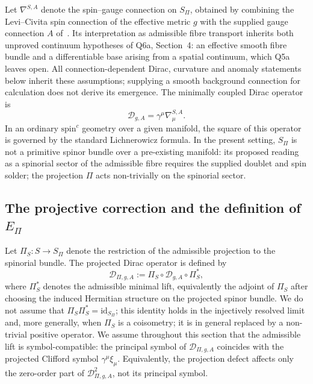\documentclass[11pt,a4paper]{article}
\theoremstyle{definition}
\theoremstyle{remark}
\begin{document}
    Let $\nabla^{S,A}$ denote the spin--gauge connection on $S_\Pi$, obtained by
    combining the Levi--Civita spin connection of the effective metric $g$ with the
    supplied gauge connection $A$ of~\cite{Beau2026q6a,Beau2026q12}.
    Its interpretation as admissible fibre transport inherits both unproved continuum hypotheses of
    Q6a, Section~4: an effective smooth fibre bundle and a differentiable base arising from a spatial
    continuum, which Q5a leaves open.
    All connection-dependent Dirac, curvature and anomaly statements below inherit these assumptions;
    supplying a smooth background connection for calculation does not derive its emergence.
    The minimally coupled Dirac operator is
    \begin{equation}
      \label{eq:minimal-dirac}
      \mathcal{D}_{g,A} = \gamma^\mu \nabla^{S,A}_\mu .
    \end{equation}
    In an ordinary $\mathrm{spin}^c$ geometry over a given manifold, the square of
    this operator is governed by the standard Lichnerowicz formula.
    In the present setting, $S_\Pi$ is not a primitive spinor bundle over a pre-existing
    manifold: its proposed reading as a spinorial sector of the admissible fibre requires the supplied
    doublet and spin solder; the projection
    $\Pi$ acts non-trivially on the spinorial sector.

  \subsection{The projective correction and the definition of
  \texorpdfstring{$E_\Pi$}{E\_Pi}}
    \label{ssec:projective-correction}

    Let $\Pi_S \colon S \to S_\Pi$ denote the restriction of the admissible projection
    to the spinorial bundle.
    The projected Dirac operator is defined by
    \begin{equation}
      \label{eq:projected-dirac}
      \mathcal{D}_{\Pi,g,A} := \Pi_S \circ \mathcal{D}_{g,A} \circ \Pi_S^* ,
    \end{equation}
    where $\Pi_S^*$ denotes the admissible minimal lift, equivalently the adjoint of
    $\Pi_S$ after choosing the induced Hermitian structure on the projected spinor
    bundle.
    We do not assume that $\Pi_S \Pi_S^* = \mathrm{id}_{S_\Pi}$; this identity holds
    in the injectively resolved limit and, more generally, when $\Pi_S$ is a coisometry; it is in general replaced by a
    non-trivial positive operator.
    We assume throughout this section that the admissible lift is symbol-compatible:
    the principal symbol of $\mathcal{D}_{\Pi,g,A}$ coincides with the projected
    Clifford symbol $\gamma^\mu \xi_\mu$.
    Equivalently, the projection defect affects only the zero-order part of
    $\mathcal{D}_{\Pi,g,A}^2$, not its principal symbol.
\end{document}
